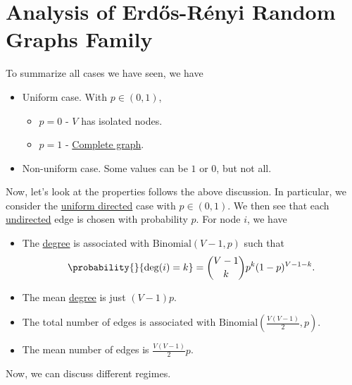 \section{Analysis of Erdős-Rényi Random Graphs Family}
\begin{prev}
	To summarize all cases we have seen, we have
	\begin{itemize}
		\item Uniform case. With \(p\in(0, 1)\),
		      \begin{itemize}
			      \item \(p = 0\) - \(V\) has isolated nodes.
			      \item \(p = 1\) - \hyperref[def:complete-graph]{Complete graph}.
		      \end{itemize}
		\item Non-uniform case. Some values can be \(1\) or \(0\), but not all.
	\end{itemize}
\end{prev}

Now, let's look at the properties follows the above discussion. In particular, we consider the
\hyperref[subsec:uniform-and-directed-model]{uniform directed} case with \(p\in(0, 1)\). We then see that each \hyperref[def:undirected-graph]{undirected}
edge is chosen with probability \(p\). For node \(i\), we have
\begin{itemize}
	\item The \hyperref[def:degree]{degree} is associated with
	      \(\mathrm{Binomial}(V-1, p)\) such that
	      \[
		      \probability{}{\deg(i) = k} = \binom{V-1}{k}p^k (1 - p)^{V-1-k}.
	      \]
	\item The mean \hyperref[def:degree]{degree} is just \((V-1)p\).
	\item The total number of edges is associated with \(\mathrm{Binomial}\left(\frac{V(V-1)}{2}, p\right)\).
	\item The mean number of edges is \(\frac{V(V-1)}{2}p\).
\end{itemize}

Now, we can discuss different regimes.

